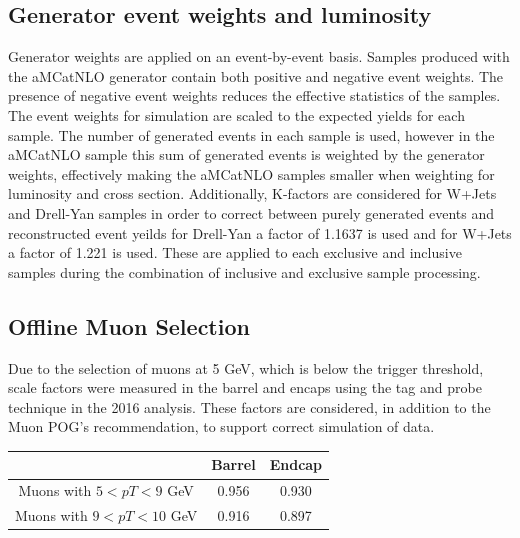 

\subsection{Generator event weights and luminosity}

Generator weights are applied on an event-by-event basis. Samples produced with the aMCatNLO generator contain both positive and negative event weights. The presence of negative event weights reduces the
effective statistics of the samples.
The event weights for simulation are scaled to the expected yields for each sample. The number
of generated events in each sample is used, however in the aMCatNLO sample this sum of
generated events is weighted by the generator weights, effectively making the aMCatNLO
samples smaller when weighting for luminosity and cross section.
Additionally, K-factors are considered for W+Jets and Drell-Yan samples in order to correct between purely generated events and reconstructed event yeilds for Drell-Yan a factor of 1.1637 is used and for W+Jets a factor of 1.221 is used. These are applied to each exclusive and inclusive samples during the combination of inclusive and exclusive sample processing.   
%
%

\subsection{Offline Muon Selection}
Due to the selection of muons at 5 GeV, which is below the trigger threshold, scale factors were measured in the barrel and encaps using the tag and probe technique in the 2016 analysis. These factors are considered, in addition to the Muon POG's recommendation, to support correct simulation of data. 
\begin{table}[h!tbp]
\centering
{}
\begin{tabular*}{0.6\textwidth}{c|c|c}
   & Barrel & Endcap \\\hline
Muons with $5 < pT < 9$ GeV & 0.956 & 0.930\\\hline
Muons with $9 < pT < 10$ GeV & 0.916 & 0.897\\\hline 
\end{tabular*}
\end{table}


